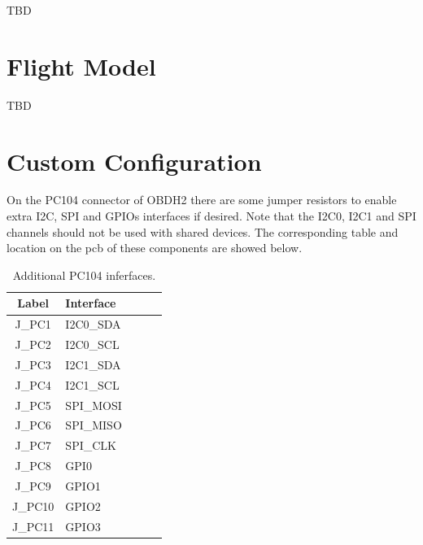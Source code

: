 TBD

\section{Flight Model}

TBD

\section{Custom Configuration}

On the PC104 connector of OBDH2 there are some jumper resistors to enable extra I2C, SPI and GPIOs interfaces if desired. Note that the I2C0, I2C1 and SPI channels should not be used with shared devices. The corresponding table and location on the pcb of these components are showed below. 

\begin{table}[!h]
    \centering
    \begin{tabular}{cllll}
        \toprule[1.5pt]
        \textbf{Label} & \textbf{Interface} \\
        \midrule
        J\_PC1            & I2C0\_SDA \\
        J\_PC2            & I2C0\_SCL \\
        J\_PC3            & I2C1\_SDA \\
        J\_PC4            & I2C1\_SCL \\
        J\_PC5            & SPI\_MOSI \\
        J\_PC6            & SPI\_MISO \\
        J\_PC7            & SPI\_CLK \\
        J\_PC8            & GPI0 \\
        J\_PC9            & GPIO1 \\
        J\_PC10           & GPIO2 \\
        J\_PC11           & GPIO3 \\
        \bottomrule[1.5pt]
    \end{tabular}
    \caption{Additional PC104 inferfaces.}
    \label{tab:additional-pc104-inferfaces}
\end{table}

